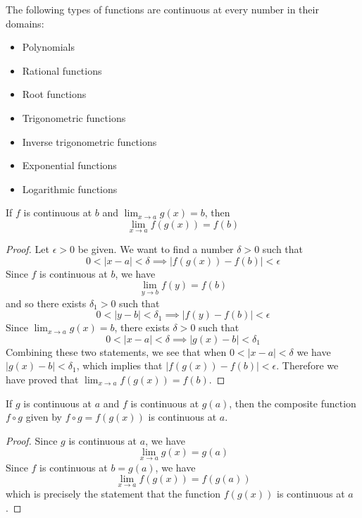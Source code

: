 \begin{theorem}
    The following types of functions are continuous at every number in their
    domains:
    \begin{itemize}
        \item Polynomials
        \item Rational functions
        \item Root functions
        \item Trigonometric functions
        \item Inverse trigonometric functions
        \item Exponential functions
        \item Logarithmic functions
    \end{itemize}
\end{theorem}
\begin{theorem}
    If \(f\) is continuous at \(b\) and
    \(\displaystyle{\lim_{x\to a}g(x)=b}\), then
    \[\lim_{x\to a}f(g(x))=f(b)\]
\end{theorem}
\begin{proof}
    Let \(\epsilon>0\) be given.
    We want to find a number \(\delta>0\) such that
    \[0<|x-a|<\delta\implies|f(g(x))-f(b)|<\epsilon\]
    Since \(f\) is continuous at \(b\),
    we have
    \[\lim_{y\to b}f(y)=f(b)\]
    and so there exists \(\delta_1>0\) such that
    \[0<|y-b|<\delta_1\implies|f(y)-f(b)|<\epsilon\]
    Since \(\displaystyle{\lim_{x\to a}g(x)=b}\),
    there exists \(\delta>0\) such that
    \[0<|x-a|<\delta\implies|g(x)-b|<\delta_1\]
    Combining these two statements,
    we see that when \(0<|x-a|<\delta\) we have \(|g(x)-b|<\delta_1\),
    which implies that \(|f(g(x))-f(b)|<\epsilon\).
    Therefore we have proved that \(\displaystyle{\lim_{x\to a}f(g(x))=f(b)}\).
\end{proof}
\begin{theorem}
    If \(g\) is continuous at \(a\) and \(f\) is continuous at \(g(a)\),
    then the composite function \(f\circ g\) given by \(f\circ g=f(g(x))\) is
    continuous at \(a\).
\end{theorem}
\begin{proof}
    Since \(g\) is continuous at \(a\),
    we have
    \[\lim_{x\to a}g(x)=g(a)\]
    Since \(f\) is continuous at \(b=g(a)\),
    we have
    \[\lim_{x\to a}f(g(x))=f(g(a))\]
    which is precisely the statement that the function \(f(g(x))\) is
    continuous at \(a\).
\end{proof}

